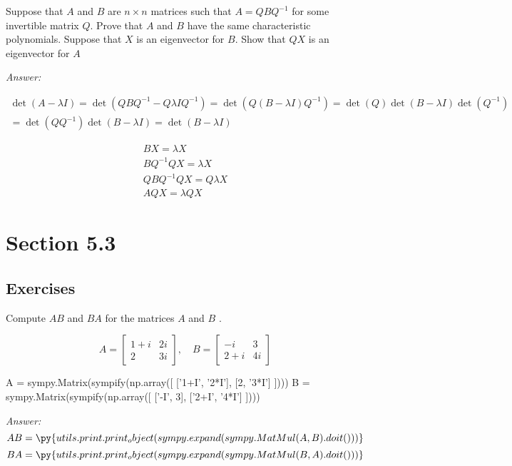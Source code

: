 \documentclass[letterpaper]{article}
\newcommand{\ans}{\textit{Answer: }}
\newenvironment{question}[2][Question]{\begin{trivlist}
\item[\hskip \labelsep {\bfseries #1}\hskip \labelsep {\bfseries #2.}]}{\end{trivlist}}
\newcommand{\printobj}[1]{\py{utils.print.print_object(#1)}}
\begin{document}
\begin{question}{5.39}
  Suppose that $A$ and $B$ are $n \times n$ matrices such that $A=Q B Q^{-1}$ for
  some invertible matrix $Q .$ Prove that $A$ and $B$ have the same characteristic polynomials.
  Suppose that $X$ is an eigenvector for $B .$ Show that $Q X$ is an eigenvector for $A$

  \ans 

  \begin{gather*}
    \det(A-\lambda I) = \det(Q B Q^{-1} - Q \lambda I Q^{-1})
    = \det(Q (B - \lambda I) Q^{-1}) = \det(Q)\det(B - \lambda I)\det(Q^{-1}) \\
    = \det(QQ^{-1})\det(B - \lambda I) = \det(B - \lambda I)
  \end{gather*}

  \begin{gather*}
    BX = \lambda X \\
    BQ^{-1}QX = \lambda X \\
    QBQ^{-1}QX = Q \lambda X \\
    AQX = \lambda Q X 
  \end{gather*}

\end{question}


\section{Section 5.3}
\subsection{Exercises}

\begin{question}{5.44}
  Compute $A B$ and $B A$ for the matrices $A$ and $B$ .

  $$
  A=\left[ \begin{array}{cc}{1+i} & {2 i} \\ {2} & {3 i}\end{array}\right], \quad B=\left[ \begin{array}{cc}{-i} & {3} \\ {2+i} & {4 i}\end{array}\right]
  $$

  \begin{pycode}
A = sympy.Matrix(sympify(np.array([
  ['1+I', '2*I'],
  [2, '3*I']
])))
B = sympy.Matrix(sympify(np.array([
  ['-I', 3],
  ['2+I', '4*I']
])))
  \end{pycode}

  \ans 
  $$AB = \printobj{sympy.expand(sympy.MatMul(A, B).doit())}$$
  $$BA = \printobj{sympy.expand(sympy.MatMul(B, A).doit())}$$
  
\end{question}
\end{document}
